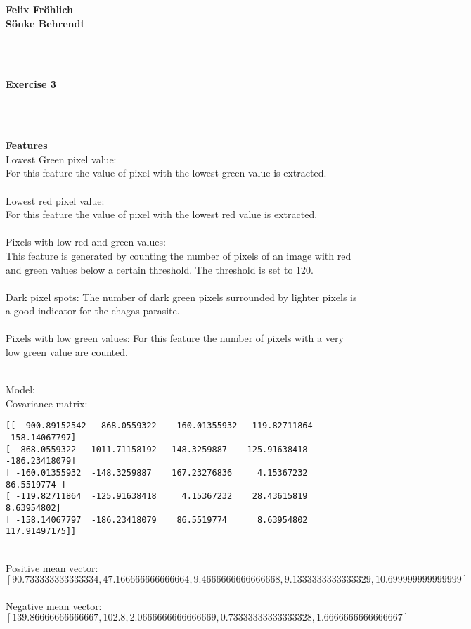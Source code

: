 \documentclass[a4paper]{article}
\begin{document}
\vspace*{-3cm}

\raggedleft
\textbf{Felix Fröhlich} \\
\textbf{Sönke Behrendt}

\centering


~\\~\\
\begin{Large}
\textbf{Exercise 3}
\end{Large}

~\\~\\
\raggedright
\textbf{Features}\\
Lowest Green pixel value:\\
For this feature the value of pixel with the lowest green value is extracted.
~\\ ~\\

Lowest red pixel value:\\
For this feature the value of pixel with the lowest red value is extracted.
~\\ ~\\

Pixels with low red and green values:\\
This feature is generated by counting the number of pixels of an image with red and green values below a certain threshold. The threshold is set to 120.
~\\ ~\\

Dark pixel spots:
The number of dark green pixels surrounded by lighter pixels is a good indicator for the chagas parasite.
~\\ ~\\

Pixels with low green values:
For this feature the number of pixels with a very low green value are counted.

~\\

Model:\\
Covariance matrix:
\begin{lstlisting}
[[  900.89152542   868.0559322   -160.01355932  -119.82711864
-158.14067797]
[  868.0559322   1011.71158192  -148.3259887   -125.91638418
-186.23418079]
[ -160.01355932  -148.3259887    167.23276836     4.15367232    86.5519774 ]
[ -119.82711864  -125.91638418     4.15367232    28.43615819
8.63954802]
[ -158.14067797  -186.23418079    86.5519774      8.63954802
117.91497175]]
\end{lstlisting}

~\\

Positive mean vector:
$[90.733333333333334, 47.166666666666664, 9.4666666666666668, 9.1333333333333329, 10.699999999999999]$
~\\

Negative mean vector:
$[139.86666666666667, 102.8, 2.0666666666666669, 0.73333333333333328, 1.6666666666666667]$
\end{document}
